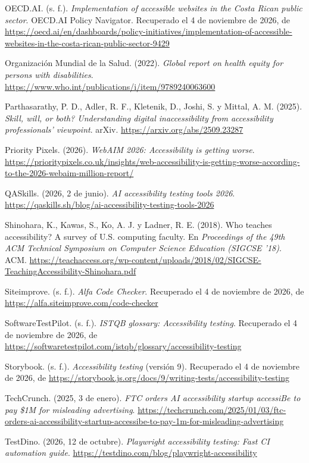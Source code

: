 \documentclass[10pt,letterpaper,onecolumn]{IEEEtran}
\begin{document}
OECD.AI. (s. f.). \emph{Implementation of accessible websites in the Costa Rican public sector}. OECD.AI Policy Navigator. Recuperado el 4 de noviembre de 2026, de \url{https://oecd.ai/en/dashboards/policy-initiatives/implementation-of-accessible-websites-in-the-costa-rican-public-sector-9429}

Organización Mundial de la Salud. (2022). \emph{Global report on health equity for persons with disabilities}. \url{https://www.who.int/publications/i/item/9789240063600}

Parthasarathy, P. D., Adler, R. F., Kletenik, D., Joshi, S. y Mittal, A. M. (2025). \emph{Skill, will, or both? Understanding digital inaccessibility from accessibility professionals' viewpoint}. arXiv. \url{https://arxiv.org/abs/2509.23287}

Priority Pixels. (2026). \emph{WebAIM 2026: Accessibility is getting worse}. \url{https://prioritypixels.co.uk/insights/web-accessibility-is-getting-worse-according-to-the-2026-webaim-million-report/}

QASkills. (2026, 2 de junio). \emph{AI accessibility testing tools 2026}. \url{https://qaskills.sh/blog/ai-accessibility-testing-tools-2026}

Shinohara, K., Kawas, S., Ko, A. J. y Ladner, R. E. (2018). Who teaches accessibility? A survey of U.S. computing faculty. En \emph{Proceedings of the 49th ACM Technical Symposium on Computer Science Education (SIGCSE '18)}. ACM. \url{https://teachaccess.org/wp-content/uploads/2018/02/SIGCSE-TeachingAccessibility-Shinohara.pdf}

Siteimprove. (s. f.). \emph{Alfa Code Checker}. Recuperado el 4 de noviembre de 2026, de \url{https://alfa.siteimprove.com/code-checker}

SoftwareTestPilot. (s. f.). \emph{ISTQB glossary: Accessibility testing}. Recuperado el 4 de noviembre de 2026, de \url{https://softwaretestpilot.com/istqb/glossary/accessibility-testing}

Storybook. (s. f.). \emph{Accessibility testing} (versión 9). Recuperado el 4 de noviembre de 2026, de \url{https://storybook.js.org/docs/9/writing-tests/accessibility-testing}

TechCrunch. (2025, 3 de enero). \emph{FTC orders AI accessibility startup accessiBe to pay \$1M for misleading advertising}. \url{https://techcrunch.com/2025/01/03/ftc-orders-ai-accessibility-startup-accessibe-to-pay-1m-for-misleading-advertising}

TestDino. (2026, 12 de octubre). \emph{Playwright accessibility testing: Fast CI automation guide}. \url{https://testdino.com/blog/playwright-accessibility}
\end{document}
